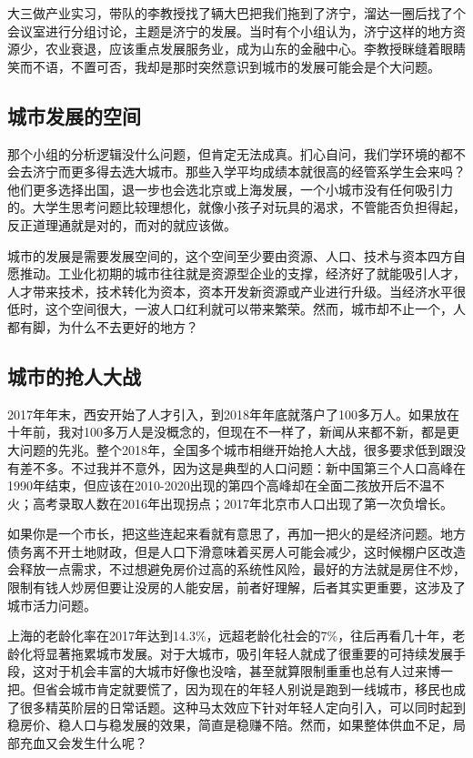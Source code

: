 \documentclass[]{book}
\begin{document}
大三做产业实习，带队的李教授找了辆大巴把我们拖到了济宁，溜达一圈后找了个会议室进行分组讨论，主题是济宁的发展。当时有个小组认为，济宁这样的地方资源少，农业衰退，应该重点发展服务业，成为山东的金融中心。李教授眯缝着眼睛笑而不语，不置可否，我却是那时突然意识到城市的发展可能会是个大问题。

\hypertarget{ux57ceux5e02ux53d1ux5c55ux7684ux7a7aux95f4}{%
\subsection{城市发展的空间}\label{ux57ceux5e02ux53d1ux5c55ux7684ux7a7aux95f4}}

那个小组的分析逻辑没什么问题，但肯定无法成真。扪心自问，我们学环境的都不会去济宁而更多得去选大城市。那些入学平均成绩本就很高的经管系学生会来吗？他们更多选择出国，退一步也会选北京或上海发展，一个小城市没有任何吸引力的。大学生思考问题比较理想化，就像小孩子对玩具的渴求，不管能否负担得起，反正道理通就是对的，而对的就应该做。

城市的发展是需要发展空间的，这个空间至少要由资源、人口、技术与资本四方自愿推动。工业化初期的城市往往就是资源型企业的支撑，经济好了就能吸引人才，人才带来技术，技术转化为资本，资本开发新资源或产业进行升级。当经济水平很低时，这个空间很大，一波人口红利就可以带来繁荣。然而，城市却不止一个，人都有脚，为什么不去更好的地方？

\hypertarget{ux57ceux5e02ux7684ux62a2ux4ebaux5927ux6218}{%
\subsection{城市的抢人大战}\label{ux57ceux5e02ux7684ux62a2ux4ebaux5927ux6218}}

2017年年末，西安开始了人才引入，到2018年年底就落户了100多万人。如果放在十年前，我对100多万人是没概念的，但现在不一样了，新闻从来都不新，都是更大问题的先兆。整个2018年，全国多个城市相继开始抢人大战，很多要求低到跟没有差不多。不过我并不意外，因为这是典型的人口问题：新中国第三个人口高峰在1990年结束，但应该在2010-2020出现的第四个高峰却在全面二孩放开后不温不火；高考录取人数在2016年出现拐点；2017年北京市人口出现了第一次负增长。

如果你是一个市长，把这些连起来看就有意思了，再加一把火的是经济问题。地方债务离不开土地财政，但是人口下滑意味着买房人可能会减少，这时候棚户区改造会释放一点需求，不过想避免房价过高的系统性风险，最好的方法就是房住不炒，限制有钱人炒房但要让没房的人能安居，前者好理解，后者其实更重要，这涉及了城市活力问题。

上海的老龄化率在2017年达到14.3\%，远超老龄化社会的7\%，往后再看几十年，老龄化将显著拖累城市发展。对于大城市，吸引年轻人就成了很重要的可持续发展手段，这对于机会丰富的大城市好像也没啥，甚至就算限制重重也总有人过来博一把。但省会城市肯定就要慌了，因为现在的年轻人别说是跑到一线城市，移民也成了很多精英阶层的日常话题。这种马太效应下针对年轻人定向引入，可以同时起到稳房价、稳人口与稳发展的效果，简直是稳赚不陪。然而，如果整体供血不足，局部充血又会发生什么呢？
\end{document}

